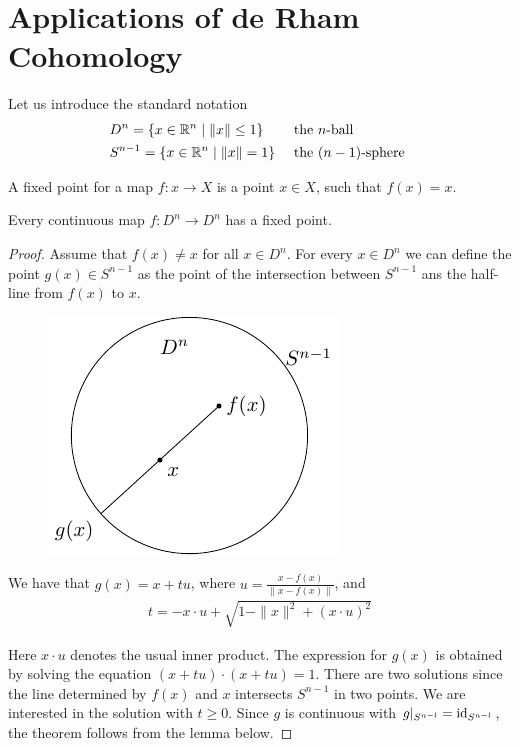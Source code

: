 \chapter{Applications of de Rham Cohomology}
Let us introduce the standard notation
\begin{align*}
  & D^n = \{x \in \mathbb{R}^n \mid \| x \| \leq 1\} && \text{ the $n$-ball } \\
  & S^{n-1} = \{x \in \mathbb{R}^n \mid \| x \| = 1\} && \text{ the $(n-1)$-sphere } 
\end{align*}

A fixed point for a map $f:x\to X$ is a point $x\in X$, such that $f(x) = x$.

\begin{theorem}\label{theorem:7-1}
  Every continuous map $f:D^n \to D^n$ has a fixed point.
\end{theorem}

\begin{proof}
  Assume that $f(x)\neq x$ for all $x\in D^n$. For every $x\in D^n$ we can define 
  the point $g(x)\in S^{n-1}$ as the point of the intersection between $S^{n-1}$ ans the half-line 
  from $f(x)$ to $x$.

\begin{figure}[!htb]
  \centering
  \includegraphics[width=.3\linewidth]{./pics/page-47.pdf} 
  \label{fig:page-47}
\end{figure}

We have that $g(x) = x+tu$, where $u=\frac{x-f(x)}{\|x-f(x)\|}$, and 
\begin{align*}
  t = -x\cdot u + \sqrt{1-\|x\|^2 + (x\cdot u)^2}
\end{align*}

Here $x\cdot u$ denotes the usual inner product. The expression for $g(x)$ is obtained
by solving the equation $(x + tu)\cdot(x + tu) = 1$. There are two solutions since the
line determined by $f(x)$ and $x$ intersects $S^{n-1}$ in two points. We are interested in
the solution with $t\ge 0$. Since $g$ is continuous with $g|_{S^{n-l}} = \operatorname{id}_{S^{n-l}}$, the 
theorem follows from the lemma below.
\end{proof}

